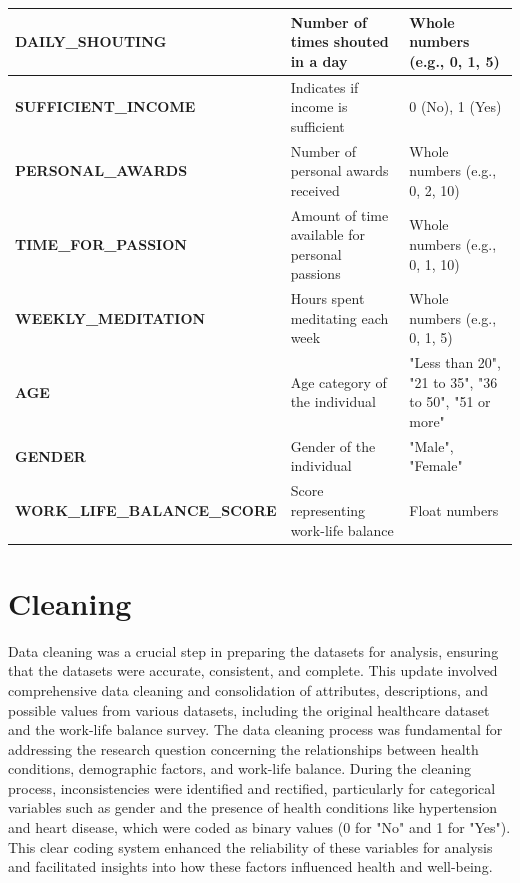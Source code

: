 \documentclass[runningheads]{llncs}
\begin{document}
\begin{enumerate}
\begin{table}[ht]
\begin{tabular}{|l|p{5cm}|p{4cm}|}
\hline
\textbf{DAILY\_SHOUTING} & Number of times shouted in a day & Whole numbers (e.g., 0, 1, 5) \\ 
\hline
\textbf{SUFFICIENT\_INCOME} & Indicates if income is sufficient & 0 (No), 1 (Yes) \\ 
\hline
\textbf{PERSONAL\_AWARDS} & Number of personal awards received & Whole numbers (e.g., 0, 2, 10) \\ 
\hline
\textbf{TIME\_FOR\_PASSION} & Amount of time available for personal passions & Whole numbers (e.g., 0, 1, 10) \\ 
\hline
\textbf{WEEKLY\_MEDITATION} & Hours spent meditating each week & Whole numbers (e.g., 0, 1, 5) \\ 
\hline
\textbf{AGE} & Age category of the individual & "Less than 20", "21 to 35", "36 to 50", "51 or more" \\ 
\hline
\textbf{GENDER} & Gender of the individual & "Male", "Female" \\ 
\hline
\textbf{WORK\_LIFE\_BALANCE\_SCORE} & Score representing work-life balance & Float numbers \\ 
\hline
\end{tabular}
\end{table}

\clearpage

\section{Cleaning}
Data cleaning was a crucial step in preparing the datasets for analysis, ensuring that the datasets were accurate, consistent, and complete. This update involved comprehensive data cleaning and consolidation of attributes, descriptions, and possible values from various datasets, including the original healthcare dataset and the work-life balance survey. The data cleaning process was fundamental for addressing the research question concerning the relationships between health conditions, demographic factors, and work-life balance. During the cleaning process, inconsistencies were identified and rectified, particularly for categorical variables such as gender and the presence of health conditions like hypertension and heart disease, which were coded as binary values (0 for "No" and 1 for "Yes"). This clear coding system enhanced the reliability of these variables for analysis and facilitated insights into how these factors influenced health and well-being. 


\end{enumerate}
\end{document}
